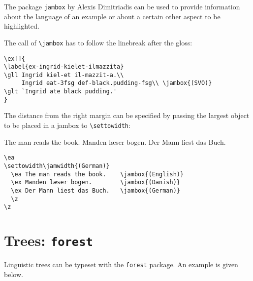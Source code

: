 The package \texttt{jambox} by Alexis Dimitriadis can be used to provide information about the language of an example or
about a certain other aspect to be highlighted.

\settowidth{}
\eal
{}
\zl

The call of \verb+\jambox+ has to follow the linebreak after the gloss:
\begin{verbatim}
\ex[]{
\label{ex-ingrid-kielet-ilmazzita}
\gll Ingrid kiel-et il-mazzit-a.\\
     Ingrid eat-3fsg def-black.pudding-fsg\\ \jambox{(SVO)}
\glt `Ingrid ate black pudding.'
}
\end{verbatim}
The distance from the right margin can be specified by passing the largest object to be placed in a
jambox to \verb+\settowidth+:

\ea 
\settowidth{}
  \ea The man reads the book.    
  \ex Manden læser bogen.        
  \ex Der Mann liest das Buch.   
  \z 
\z

\begin{verbatim}
\ea 
\settowidth\jamwidth{(German)}
  \ea The man reads the book.    \jambox{(English)}
  \ex Manden læser bogen.        \jambox{(Danish)}
  \ex Der Mann liest das Buch.   \jambox{(German)}
  \z
\z
\end{verbatim}



\section{Trees: \texttt{forest}}
Linguistic trees can be typeset with the \verb+forest+ package. An example is given below.

